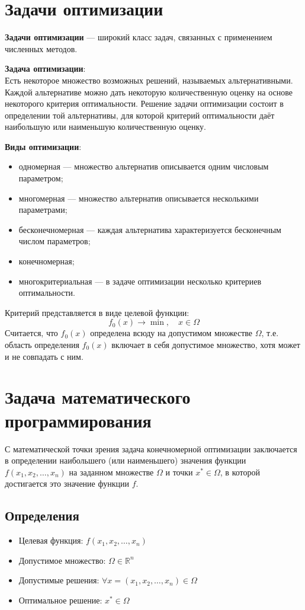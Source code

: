 \documentclass[17pt]{extarticle}
\begin{document}
\section{Задачи оптимизации}

\textbf{Задачи оптимизации} — широкий класс задач, связанных с применением численных методов.

\textbf{Задача оптимизации}: \\
Есть некоторое множество возможных решений, называемых альтернативными. Каждой альтернативе можно дать некоторую количественную оценку на основе некоторого критерия оптимальности. Решение задачи оптимизации состоит в определении той альтернативы, для которой критерий оптимальности даёт наибольшую или наименьшую количественную оценку.

\textbf{Виды оптимизации}:
\begin{itemize}
    \item одномерная — множество альтернатив описывается одним числовым параметром;
    \item многомерная — множество альтернатив описывается несколькими параметрами;
    \item бесконечномерная — каждая альтернатива характеризуется бесконечным числом параметров;
    \item конечномерная;
    \item многокритериальная — в задаче оптимизации несколько критериев оптимальности.
\end{itemize}

Критерий представляется в виде целевой функции: \\
\[ f_0(x) \to \min, \quad x \in \Omega \]
Считается, что \( f_0(x) \) определена всюду на допустимом множестве \( \Omega \), т.е. область определения \( f_0(x) \) включает в себя допустимое множество, хотя может и не совпадать с ним.




\section{Задача математического программирования}

С математической точки зрения задача конечномерной оптимизации заключается в определении наибольшего (или наименьшего) значения функции \( f(x_1, x_2, \dots, x_n) \) на заданном множестве \( \Omega \) и точки \( x^* \in \Omega \), в которой достигается это значение функции \( f \).

\subsection{Определения}
\begin{itemize}
    \item Целевая функция: \( f(x_1, x_2, \dots, x_n) \)
    \item Допустимое множество: \( \Omega \in \mathbb{R}^{n} \)
    \item Допустимые решения: \( \forall x = (x_1, x_2, \dots, x_n) \in \Omega \)
    \item Оптимальное решение: \( x^* \in \Omega \)
\end{itemize}
\end{document}
